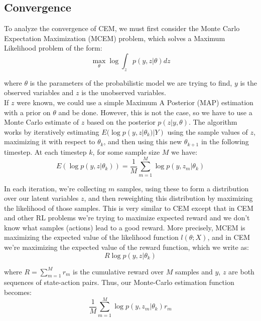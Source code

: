 \documentclass[11pt]{article}
\theoremstyle{plain}
\theoremstyle{definition}
\begin{document}
\subsection{Convergence}

To analyze the convergence of CEM, we must first consider the Monte Carlo Expectation Maximization (MCEM) problem, which solves a Maximum Likelihood problem of the form:
\begin{equation}
\max_\theta \log \int_z p(y,z | \theta)dz
\end{equation}

where $\theta$ is the parameters of the probabilistic model we are trying to find, $y$ is the observed variables and $z$ is the unobserved variables.
\\

If $z$ were known, we could use a simple Maximum A Posterior (MAP) estimation with a prior on $\theta$ and be done. However, this is not the case, so we have to use a Monte Carlo estimate of $z$ based on the posterior $p(z|y,\theta)$. The algorithm works by iteratively estimating $E(\log p(y,z|\theta_k) | Y)$ using the sample values of $z$, maximizing it with respect to $\theta_k$, and then using this new $\theta_{k+1}$ in the following timestep. At each timestep $k$, for some sample size $M$ we have:
\begin{equation}
E(\log p(y,z|\theta_k)) = \dfrac{1}{M} \sum_{m=1}^M \log p(y, z_m| \theta_k)
\end{equation}

In each iteration, we're collecting $m$ samples, using these to form a distribution over our latent variables $z$, and then reweighting this distribution by maximizing the likelihood of those samples. This is very similar to CEM except that in CEM and other RL problems we're trying to maximize expected reward and we don't know what samples (actions) lead to a good reward. More precisely, MCEM is maximizing the expected value of the likelihood function $l(\theta;X)$, and in CEM we're maximizing the expected value of the reward function, which we write as:
\begin{equation}
R \log p(y,z| \theta_k)
\end{equation}

where $R = \sum_{m=1}^M r_m$ is the cumulative reward over $M$ samples and $y$, $z$ are both sequences of state-action pairs. Thus, our Monte-Carlo estimation function becomes:
\begin{equation}
\dfrac{1}{M} \sum_{m=1}^M \log p(y,z_m| \theta_k) r_m
\end{equation}
\\
\end{document}
